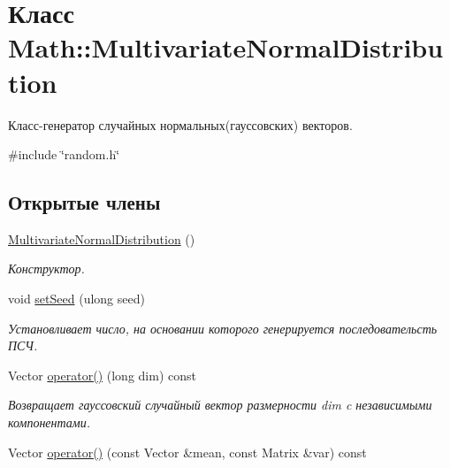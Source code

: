 \hypertarget{class_math_1_1_multivariate_normal_distribution}{}\section{Класс Math\+:\+:Multivariate\+Normal\+Distribution}
\label{class_math_1_1_multivariate_normal_distribution}


Класс-\/генератор случайных нормальных(гауссовских) векторов.  




{\ttfamily \#include \char`\"{}random.\+h\char`\"{}}

\subsection*{Открытые члены}
\begin{DoxyCompactItemize}
\item 
\hyperlink{class_math_1_1_multivariate_normal_distribution_aa72eb69d327a37bf1a3066b26c665ef6}{Multivariate\+Normal\+Distribution} ()\hypertarget{class_math_1_1_multivariate_normal_distribution_aa72eb69d327a37bf1a3066b26c665ef6}{}\label{class_math_1_1_multivariate_normal_distribution_aa72eb69d327a37bf1a3066b26c665ef6}

\begin{DoxyCompactList}\small\item\em Конструктор. \end{DoxyCompactList}\item 
void \hyperlink{class_math_1_1_multivariate_normal_distribution_a32af57a288a3e2f36a48f957c7cf5274}{set\+Seed} (ulong seed)\hypertarget{class_math_1_1_multivariate_normal_distribution_a32af57a288a3e2f36a48f957c7cf5274}{}\label{class_math_1_1_multivariate_normal_distribution_a32af57a288a3e2f36a48f957c7cf5274}

\begin{DoxyCompactList}\small\item\em Установливает число, на основании которого генерируется последовательсть ПСЧ. \end{DoxyCompactList}\item 
Vector \hyperlink{class_math_1_1_multivariate_normal_distribution_a362bfdc2a3150f18f5a8f0fd6c0b9716}{operator()} (long dim) const \hypertarget{class_math_1_1_multivariate_normal_distribution_a362bfdc2a3150f18f5a8f0fd6c0b9716}{}\label{class_math_1_1_multivariate_normal_distribution_a362bfdc2a3150f18f5a8f0fd6c0b9716}

\begin{DoxyCompactList}\small\item\em Возвращает гауссовский случайный вектор размерности dim c независимыми компонентами. \end{DoxyCompactList}\item 
Vector \hyperlink{class_math_1_1_multivariate_normal_distribution_a15ad0690b6434b8baeefaaf325fb1b8e}{operator()} (const Vector \&mean, const Matrix \&var) const 
\end{DoxyCompactItemize}
